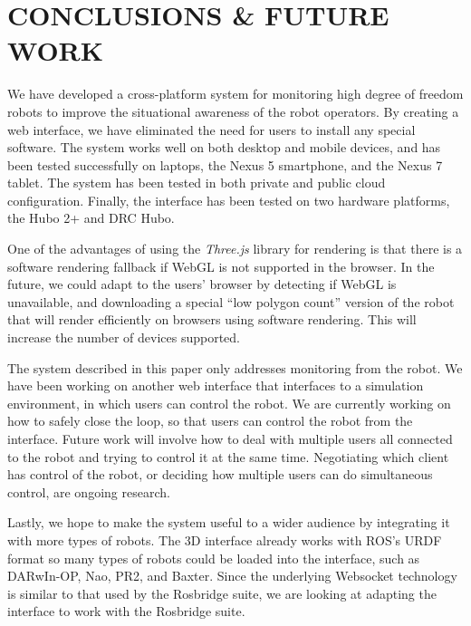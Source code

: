 \documentclass[letterpaper, 10 pt, conference]{ieee/ieeeconf}  %
\begin{document}
\section{CONCLUSIONS & FUTURE WORK}
We have developed a cross-platform system for monitoring high degree of freedom robots to improve the situational awareness of the robot operators.
By creating a web interface, we have eliminated the need for users to install any special software.
The system works well on both desktop and mobile devices, and has been tested successfully on laptops, the Nexus 5 smartphone, and the Nexus 7 tablet.
The system has been tested in both private and public cloud configuration.
Finally, the interface has been tested on two hardware platforms, the Hubo 2+ and DRC Hubo.

One of the advantages of using the \textit{Three.js} library for rendering is that there is a software rendering fallback if WebGL is not supported in the browser.
In the future, we could adapt to the users' browser by detecting if WebGL is unavailable, and downloading a special ``low polygon count'' version of the robot that will render efficiently on browsers using software rendering.
This will increase the number of devices supported.

The system described in this paper only addresses monitoring from the robot.
We have been working on another web interface that interfaces to a simulation environment, in which users can control the robot.
We are currently working on how to safely close the loop, so that users can control the robot from the interface.
Future work will involve how to deal with multiple users all connected to the robot and trying to control it at the same time.
Negotiating which client has control of the robot, or deciding how multiple users can do simultaneous control, are ongoing research.

Lastly, we hope to make the system useful to a wider audience by integrating it with more types of robots.
The 3D interface already works with ROS's URDF format so many types of robots could be loaded into the interface, such as DARwIn-OP, Nao, PR2, and Baxter.
Since the underlying Websocket technology is similar to that used by the Rosbridge suite, we are looking at adapting the interface to work with the Rosbridge suite.




\end{document}
